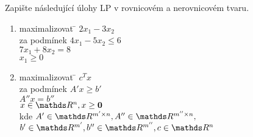 


\begin{zadani}
Zapište následující úlohy LP v rovnicovém a nerovnicovém tvaru.
\begin{enumerate}
\item
	\begin{tabbing}
		maximalizovat \= $2x_1 - 3x_2$ \\
		za podmínek \> $4x_1 - 5x_2 \leq 6$ \\
		\> $7x_1 + 8x_2 = 8 $ \\
		\> $x_1 \geq 0$
	\end{tabbing}

\item
	\begin{tabbing}
		maximalizovat \= $c^Tx$ \\
		za podmínek \> $A'x \geq b'$ \\
		\> $A''x = b''$ \\
		\> $x \in \R^n, x \geq \vec 0$ \\
		\> kde $A' \in \R^{m' \times n}, A'' \in \R^{m'' \times n},$\\
		\> $b' \in \R^{m'}, b'' \in \R^{m''}, c \in \R^{n}$
	\end{tabbing}
\end{enumerate}
\end{zadani}

